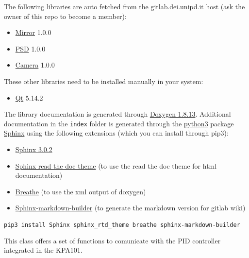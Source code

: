 
The following libraries are auto fetched from the gitlab.dei.unipd.it
host (ask the owner of this repo to become a member):

\begin{itemize}
  \tightlist
  \item
        \href{https://gitlab.dei.unipd.it/PAT/Mirror}{Mirror} 1.0.0
  \item
        \href{https://gitlab.dei.unipd.it/PAT/PSD}{PSD} 1.0.0
  \item
        \href{https://gitlab.dei.unipd.it/PAT/Camera}{Camera} 1.0.0
\end{itemize}

These other libraries need to be installed manually in your system:

\begin{itemize}
  \tightlist
  \item
        \href{https://www.qt.io/}{Qt} 5.14.2
\end{itemize}

The library documentation is generated through
\href{http://www.doxygen.nl/download.html}{Doxygen 1.8.13}. Additional
documentation in the \texttt{index} folder is generated through the
\href{https://www.anaconda.com/products/individual}{python3} package
\href{https://www.sphinx-doc.org/en/master/}{Sphinx} using the following
extensions (which you can install through pip3):

\begin{itemize}
  \tightlist
  \item
        \href{https://pypi.org/project/Sphinx/}{Sphinx 3.0.2}
  \item
        \href{https://sphinx-rtd-theme.readthedocs.io/en/stable/}{Sphinx read
          the doc theme} (to use the read the doc theme for html documentation)
  \item
        \href{https://pypi.org/project/breathe/}{Breathe} (to use the xml
        output of doxygen)
  \item
        \href{https://pypi.org/project/sphinx-markdown-builder/}{Sphinx-markdown-builder}
        (to generate the markdown version for gitlab wiki)
\end{itemize}

\texttt{pip3\ install\ Sphinx\ sphinx\_rtd\_theme\ breathe\ sphinx-markdown-builder}



This class offers a set of functions to comunicate with the PID
controller integrated in the KPA101.

